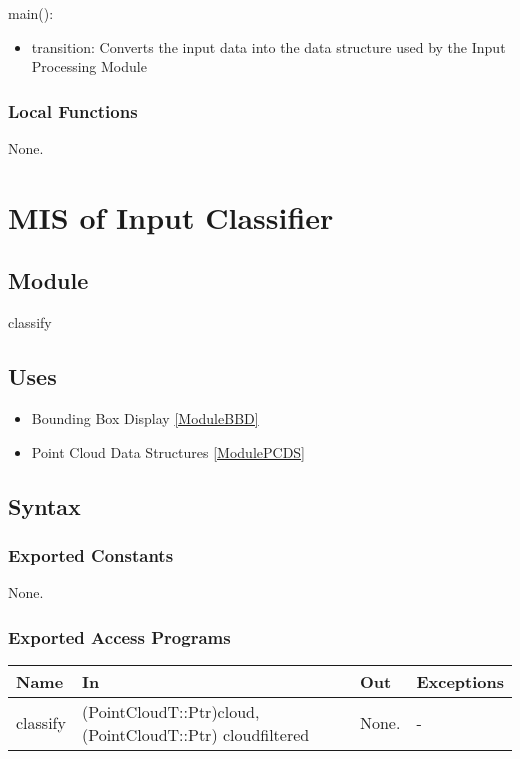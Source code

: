\documentclass[12pt, titlepage]{article}
\begin{document}
\noindent main():
\begin{itemize}
  \item transition: Converts the input data into the data structure used by the Input Processing Module
\end{itemize}

\subsubsection{Local Functions}

None.

\newpage

\section{MIS of Input Classifier} \label{ModuleIC} 

\subsection{Module}

classify

\subsection{Uses}


\begin{itemize}
  \item Bounding Box Display \ref{ModuleBBD}
  \item Point Cloud Data Structures \ref{ModulePCDS}
\end{itemize}

\subsection{Syntax}

\subsubsection{Exported Constants}

None.

\subsubsection{Exported Access Programs}

\begin{center}
\begin{tabular}{p{2cm} p{5cm} p{4cm} p{2cm}}
\hline
\textbf{Name} & \textbf{In} & \textbf{Out} & \textbf{Exceptions} \\
\hline
classify & (PointCloudT::Ptr)cloud, (PointCloudT::Ptr) cloudfiltered & None. & - \\
\hline
\end{tabular}
\end{center}
\end{document}
